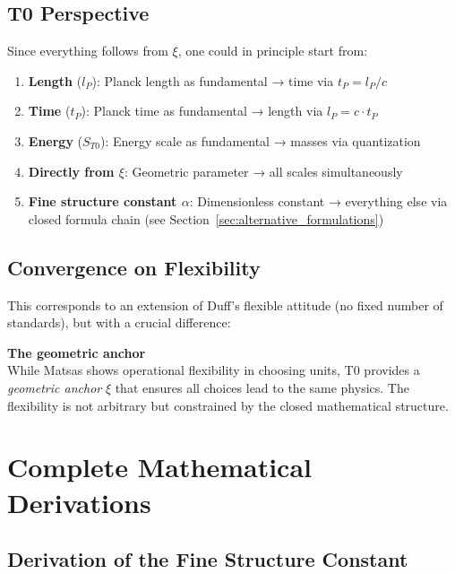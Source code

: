 	\subsection{T0 Perspective}
	
	Since everything follows from $\xi$, one could in principle start from:
	
	\begin{enumerate}
		\item \textbf{Length} ($l_P$): Planck length as fundamental → time via $t_P = l_P/c$
		\item \textbf{Time} ($t_P$): Planck time as fundamental → length via $l_P = c \cdot t_P$
		\item \textbf{Energy} ($S_{T0}$): Energy scale as fundamental → masses via quantization
		\item \textbf{Directly from $\xi$}: Geometric parameter → all scales simultaneously
		\item \textbf{Fine structure constant $\alpha$}: Dimensionless constant → everything else via closed formula chain (see Section~\ref{sec:alternative_formulations})
	\end{enumerate}
	
	\subsection{Convergence on Flexibility}
	
	This corresponds to an extension of Duff's flexible attitude (no fixed number of standards), but with a crucial difference:
	
	\begin{insight}
		\textbf{The geometric anchor}\\
		While Matsas shows operational flexibility in choosing units, T0 provides a \emph{geometric anchor} $\xi$ that ensures all choices lead to the same physics. The flexibility is not arbitrary but constrained by the closed mathematical structure.
	\end{insight}
	
	\section{Complete Mathematical Derivations}
	
	\subsection{Derivation of the Fine Structure Constant}\label{sec:alpha_derivation}
	
